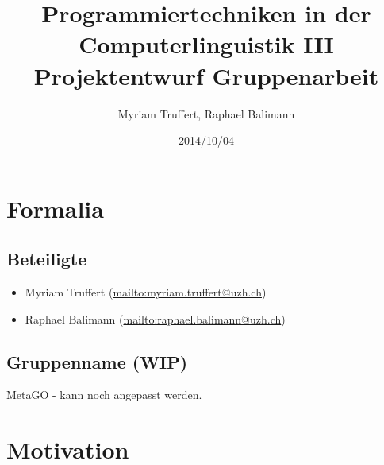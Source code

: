 \documentclass[a4paper]{article}
\title{Programmiertechniken in der Computerlinguistik III \\ Projektentwurf Gruppenarbeit}
\author{Myriam Truffert,  Raphael Balimann}
\date{2014/10/04}
\begin{document}
\maketitle

\section{Formalia}

\subsection{Beteiligte}

\begin{itemize}
	\item Myriam Truffert (\url{mailto:myriam.truffert@uzh.ch})
	\item Raphael Balimann (\url{mailto:raphael.balimann@uzh.ch})
\end{itemize}

\subsection{Gruppenname (WIP)}

MetaGO - kann noch angepasst werden.


\section{Motivation}
\end{document}
